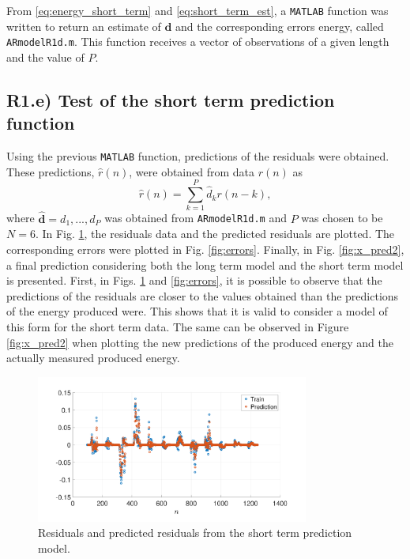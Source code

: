 \documentclass[a4paper, oneside, 11pt]{article}
\begin{document}
From \eqref{eq:energy_short_term} and \eqref{eq:short_term_est}, a \texttt{MATLAB}{\texttrademark} function was written to return an estimate of $\mathbf{d}$ and the corresponding errors energy, called \texttt{ARmodelR1d.m}. This function receives a vector of observations of a given length and the value of $P$.

\subsection{R1.e) Test of the short term prediction function}

Using the previous \texttt{MATLAB}{\texttrademark} function, predictions of the residuals were obtained. These predictions, $\hat{r}(n)$, were obtained from data $r(n)$ as
\begin{equation}
    \hat{r}(n) = \sum_{k=1}^P \hat{d}_k r(n-k),
\end{equation}
where $\hat{\mathbf{d}} = d_1, ..., d_P$ was obtained from \texttt{ARmodelR1d.m} and $P$ was chosen to be $N=6$. In Fig. \ref{fig:residuals_prediction}, the residuals data and the predicted residuals are plotted. The corresponding errors were plotted in Fig. \ref{fig:errors}. Finally, in Fig. \ref{fig:x_pred2}, a final prediction considering both the long term model and the short term model is presented. First, in Figs. \ref{fig:residuals_prediction} and \ref{fig:errors}, it is possible to observe that the predictions of the residuals are closer to the values obtained than the predictions of the energy produced were. This shows that it is valid to consider a model of this form for the short term data. The same can be observed in Figure \ref{fig:x_pred2} when plotting the new predictions of the produced energy and the actually measured produced energy.

\begin{figure}[ht]
    \centering
    \includegraphics[width=0.8\textwidth]{figures/short_term_pred_res.pdf}
    \caption{Residuals and predicted residuals from the short term prediction model.}
    \label{fig:residuals_prediction}
\end{figure}
\end{document}
